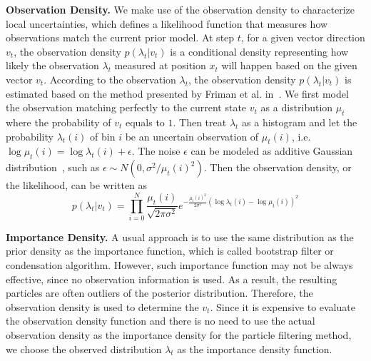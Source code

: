 \noindent\textbf{Observation Density.} We make use of the observation density to characterize local uncertainties, which defines a likelihood function that measures how observations match the current prior model. At step $t$, for a given vector direction $v_t$, the observation density $p({\lambda_t}|{v_t})$ is a conditional density representing how likely the observation $\lambda_t$ measured at position $x_t$ will happen based on the given vector $v_t$. According to the observation $\lambda_t$, the observation density $p({\lambda_t}|{v_t})$ is estimated based on the method presented by Friman et al. in~\cite{frimanTMI06}. We first model the observation matching perfectly to the current state $v_t$ as a distribution $\mu_t$ where the probability of $v_t$ equals to $1$. Then treat $\lambda_t$ as a histogram and let the probability $\lambda_t(i)$ of bin $i$ be an uncertain observation of $\mu_t(i)$, i.e. $\log{\mu_t(i)}=\log{\lambda_t(i)}+\epsilon$. The noise $\epsilon$ can be modeled as additive Gaussian distribution~\cite{Basser1994,Salvador05}, such as $\epsilon \sim N(0,{\sigma ^2}/{\mu _t}{(i)^2})$. Then the observation density, or the likelihood, can be written as
\begin{equation}
  p({\lambda_t}|{v_t}) = \prod\limits_{i = 0}^N {\frac{{{\mu _t}(i)}}{{\sqrt {2\pi {\sigma ^2}} }}} {e^{ - \frac{{{\mu _t}{{(i)}^2}}}{{{2\sigma ^2}}}{{(\log{{\lambda _t}(i)} - \log{{\mu _t}(i)})}^2}}}
\end{equation}

\noindent\textbf{Importance Density.} A usual approach is to use the same distribution as the prior density as the importance function, which is called bootstrap filter or condensation algorithm. However, such importance function may not be always effective, since no observation information is used. As a result, the resulting particles are often outliers of the posterior distribution. Therefore, the observation density is used to determine the $v_t$. Since it is expensive to evaluate the observation density function and there is no need to use the actual observation density as the importance density for the particle filtering method, we choose the observed distribution $\lambda_t$ as the importance density function.
